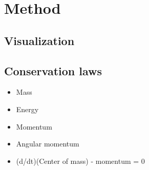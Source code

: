 \part{Method}






\chapter{Visualization}

\chapter{Conservation laws}

\begin{itemize}
    \item Mass
    \item Energy
    \item Momentum
    \item Angular momentum
    \item (d/dt)(Center of mass) - momentum = 0
\end{itemize}
